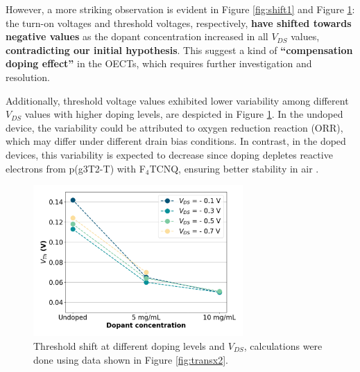 
However, a more striking observation is evident in Figure \ref{fig:shift1} and Figure \ref{fig:vth_vds}: the turn-on voltages and threshold voltages, respectively, \textbf{have shifted towards negative values} as the dopant concentration increased in all $V_{DS}$ values, \textbf{contradicting our initial hypothesis}. This suggest a kind of \textbf{``compensation doping effect''} in the OECTs, which requires further investigation and resolution. %

Additionally, threshold voltage values exhibited lower variability among different $V_{DS}$ values with higher doping levels, are despicted in Figure \ref{fig:vth_vds}. In the undoped device, the variability could be attributed to oxygen reduction reaction (ORR), which may differ under different drain bias conditions. In contrast, in the doped devices, this variability is expected to decrease since doping depletes reactive electrons from p(g3T2-T) with F$_{4}$TCNQ, ensuring better stability in air \cite{tanTuningOrganicElectrochemical2022}. %

\begin{figure}[ht]
  \centering
  \includegraphics[width=8cm]{Images/pdf/vth_shift_vds.pdf}
  \caption[Threshold shift at different doping levels and $V_{DS}$]{Threshold shift at different doping levels and $V_{DS}$, calculations were done using data shown in Figure \ref{fig:transx2}.}
  \label{fig:vth_vds}
\end{figure}


